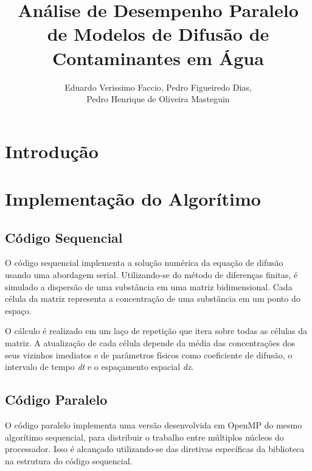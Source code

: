\documentclass[12pt]{article}
\title{Análise de Desempenho Paralelo de Modelos de Difusão de Contaminantes em
  Água}
\author{Eduardo Verissimo Faccio, Pedro Figueiredo Dias, \\
  Pedro Henrique de Oliveira Masteguin}
\begin{document}
\maketitle


\section{Introdução}

\section{Implementação do Algorítimo}

\subsection{Código Sequencial}

O código sequencial implementa a solução numérica da equação de difusão usando
uma abordagem serial. Utilizando-se do método de diferenças finitas, é simulado
a dispersão de uma substância em uma matriz bidimensional. Cada célula da
matriz representa a concentração de uma substância em um ponto do espaço.

O cálculo é realizado em um laço de repetição que itera sobre todas as células
da matriz. A atualização de cada célula depende da média das concentrações dos
seus vizinhos imediatos e de parâmetros físicos como coeficiente de difusão, o
intervalo de tempo \textit{dt} e o espaçamento espacial \textit{dx}.

\subsection{Código Paralelo}

O código paralelo implementa uma versão desenvolvida em OpenMP do mesmo
algorítimo sequencial, para distribuir o trabalho entre múltiplos núcleos do
processador. Isso é alcançado utilizando-se das diretivas específicas da
biblioteca na estrutura do código sequencial.
\end{document}
